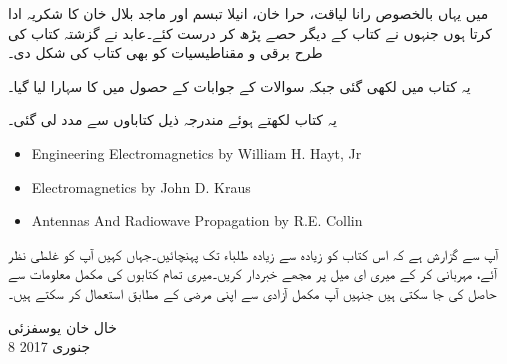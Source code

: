 میں یہاں بالخصوص رانا لیاقت، حرا خان، انیلا تبسم اور ماجد بلال خان کا شکریہ ادا کرتا ہوں جنہوں نے کتاب کے دیگر حصے پڑھ کر درست کئے۔عابد نے گزشتہ کتاب کی طرح برقی و مقناطیسیات کو بھی کتاب کی شکل دی۔

یہ کتاب  میں لکھی گئی جبکہ سوالات کے جوابات کے حصول میں  کا سہارا لیا گیا۔

یہ کتاب لکھتے ہوئے مندرجہ ذیل کتاباوں سے مدد لی گئی۔
\begin{otherlanguage}{english}
\begin{itemize}
\item
Engineering Electromagnetics by William H. Hayt, Jr
\item
Electromagnetics by John D. Kraus
\item
Antennas And Radiowave Propagation by R.E. Collin
\end{itemize}
\end{otherlanguage}

آپ سے گزارش ہے کہ اس کتاب کو زیادہ سے زیادہ طلباء تک پہنچائیں۔جہاں کہیں آپ کو غلطی نظر آئے، مہربانی کر کے میری ای میل پر مجھے خبردار کریں۔میری تمام کتابوں کی مکمل  معلومات  سے حاصل کی جا سکتی ہیں جنہیں آپ مکمل آزادی سے اپنی مرضی کے مطابق استعمال کر سکتے ہیں۔

خال خان یوسفزئی\\
8 جنوری 2017

